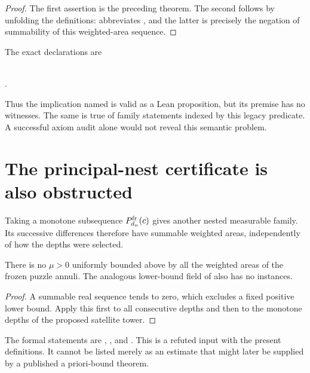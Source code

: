 \begin{proof}
The first assertion is the preceding theorem.  The second follows by
unfolding the definitions:  abbreviates
, and the latter is precisely the negation
of summability of this weighted-area sequence.
\end{proof}

\begin{samepage}
The exact declarations are
\begin{center}\small
{}\\
.
\end{center}
\end{samepage}
Thus the implication named  is valid
as a Lean proposition, but its premise has no witnesses.  The same is
true of family statements indexed by this legacy predicate.  A
successful axiom audit alone would not reveal this semantic problem.

\section{The principal-nest certificate is also obstructed}

Taking a monotone subsequence $P_{d_n}^{\rm fr}(c)$ gives another
nested measurable family.  Its successive differences therefore have
summable weighted areas, independently of how the depths were selected.

\begin{corollary}
\label{cor:no-frozen-certificate}
There is no $\mu>0$ uniformly bounded above by all the weighted areas
of the frozen puzzle annuli.  The analogous lower-bound field of
 also has no instances.
\end{corollary}

\begin{proof}
A summable real sequence tends to zero, which excludes a fixed positive
lower bound.  Apply this first to all consecutive depths and then to the
monotone depths of the proposed satellite tower.
\end{proof}

The formal statements are
,
, and
.
This is a refuted input with the present definitions.  It cannot be
listed merely as an estimate that might later be supplied by a
published a priori-bound theorem.

